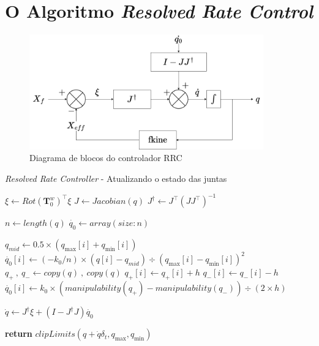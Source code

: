 \section{O Algoritmo \emph{Resolved Rate Control}}

\begin{figure}
    \centering
    \includegraphics[width=0.9\textwidth]{./Images/control-scheme.png}
    \caption{Diagrama de blocos do controlador RRC}\label{fig:block-diagram}
\end{figure}

\begin{algorithm}
    \caption{\emph{Resolved Rate Controller} {-} Atualizando o estado das juntas}\label{rrc-alg}
    \begin{algorithmic}[1]
        \State$\xi \gets {Rot(\mathbf{T}^w_0)}^\top \xi$
        \State$J \gets Jacobian(q)$
        \State$J^\dag \gets J^\top {(J J^\top)}^{-1}$

        \State$n \gets length(q)$
        \State$\dot{q_0} \gets array(size: n)$

         
        \State$q_{mid} \gets 0.5 \times (q_{\max}[i] + q_{\min}[i])$
        \State$\dot{q_0}[i] \gets (-k_0 / n) \times (q[i] - q_{mid}) \div {{(q_{\max}[i] - q_{\min}[i])}^2}$
        \State$q_{+} \ , \ q_{-} \gets copy(q) \ , \ copy(q)$
        \State$q_{+}[i] \gets q_{+}[i] + h$
        \State$q_{-}[i] \gets q_{-}[i] - h$
        \State$\dot{q_0}[i] \gets k_0 \times (manipulability(q_{+}) - manipulability(q_{-})) \div (2 \times h)$
        \EndIf{}
        \EndFor{}

        \State$\dot{q} \gets J^\dag \xi + (I - J^\dag J) \dot{q_0}$

        \State\textbf{return} $clipLimits(q + \dot{q} \delta_t, q_{\max}, q_{\min})$ 
        \EndProcedure\end{algorithmic}
\end{algorithm}

